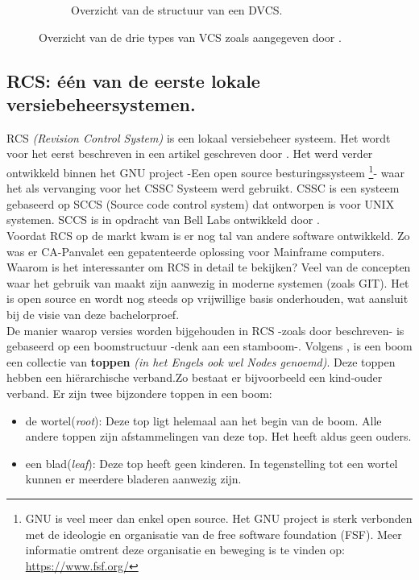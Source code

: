 \begin{figure}[h!]
\begin{subfigure}{.5\textwidth}
	\caption[Overzicht structuur DVCS]{Overzicht van de structuur van een DVCS.}
	\end{subfigure}
	
	\caption[Overzicht types VCS]{Overzicht van de drie types van VCS zoals aangegeven door \textcite{Chacon2014}.}\label{fig_types_cvs}
\end{figure}

	
\subsection{RCS: één van de eerste lokale versiebeheersystemen.}
\label{sec:RCS}


RCS \textit{(Revision Control System)} is een lokaal versiebeheer systeem. Het wordt voor het eerst beschreven in een artikel geschreven door \textcite{Tichy85rcs}. Het werd verder ontwikkeld binnen het GNU project -Een open source besturingssysteem \footnote{GNU is veel meer dan enkel open source. Het GNU project is sterk verbonden met de ideologie en organisatie van de free software foundation (FSF). Meer informatie omtrent deze organisatie en beweging is te vinden op: \url{https://www.fsf.org/}}- waar het als vervanging voor het CSSC Systeem \autocite{GNUCSSC} werd gebruikt. CSSC is een systeem gebaseerd op SCCS (Source code control system) dat ontworpen is voor UNIX systemen. SCCS is in opdracht van Bell Labs ontwikkeld door \textcite{Rochkind1975}.\\

Voordat RCS op de markt kwam is er nog tal van andere software ontwikkeld. Zo was er CA-Panvalet een gepatenteerde oplossing voor Mainframe computers.\\

Waarom is het interessanter om RCS in detail te bekijken? Veel van de concepten waar het gebruik van maakt zijn aanwezig in moderne systemen (zoals GIT). Het is open source en wordt nog steeds op vrijwillige basis onderhouden, wat aansluit bij de visie van deze bachelorproef.\\

De manier waarop versies worden bijgehouden in RCS -zoals door \textcite{Tichy85rcs} beschreven- is gebaseerd op een boomstructuur -denk aan een stamboom-. Volgens \textcite{Lievens2019}, is een boom een collectie van \textbf{toppen} \textit{(in het Engels ook wel Nodes genoemd)}. Deze toppen hebben een hiërarchische verband.Zo bestaat er bijvoorbeeld een kind-ouder verband. Er zijn twee bijzondere toppen in een boom:

\begin{itemize}
	\item de wortel(\textit{root}): Deze top ligt helemaal aan het begin van de boom. Alle andere toppen zijn afstammelingen van deze top. Het heeft aldus geen ouders.
	\item een blad(\textit{leaf}): Deze top heeft geen kinderen. In tegenstelling tot een wortel kunnen er meerdere bladeren aanwezig zijn.
\end{itemize}

